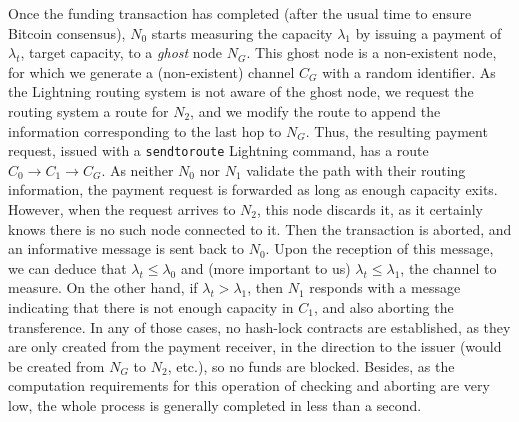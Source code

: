 Once the funding transaction has completed (after the usual time to ensure Bitcoin consensus), 
$N_0$ starts measuring the capacity $\lambda_{1}$ by issuing a payment of $\lambda_t$, target capacity, 
to a \textit{ghost} node $N_G$.
This ghost node is a non-existent node, for which we generate a (non-existent) channel $C_{G}$ with a random identifier.
As the Lightning routing system is not aware of the ghost node, we request the routing system a route for $N_2$, 
and we modify the route to append the information corresponding to the last hop to $N_G$.
Thus, the resulting payment request, issued with a \texttt{sendtoroute} Lightning command, has a route $C_{0} \rightarrow C_1 \rightarrow C_{G}$. 
As neither $N_0$ nor $N_1$ validate the path with their routing information, the payment request is forwarded as long as enough capacity exits. 
However, when the request arrives to $N_2$, this node discards it, as it certainly knows there is no such node connected to it. 
Then the transaction is aborted, and an informative message is sent back to $N_0$.
Upon the reception of this message, we can deduce that $\lambda_t \leq \lambda_{0}$ and (more important to us) $\lambda_t \leq \lambda_{1}$, the channel to measure.
On the other hand, if $\lambda_t > \lambda_{1}$, then $N_1$ responds with a message indicating that there is not enough capacity in $C_1$, and also aborting the transference. 
In any of those cases, no hash-lock contracts are established, as they are only created from the payment receiver, in the direction to the issuer (would be created from $N_G$ to $N_2$, etc.), so no funds are blocked. 
Besides, as the computation requirements for this operation of checking and aborting are very low, the whole process is generally completed in less than a second. 

